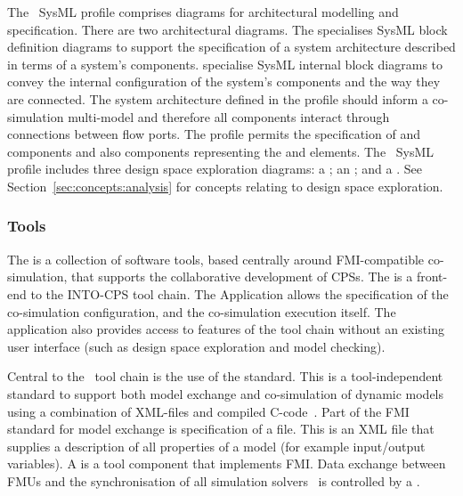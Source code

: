 The \into\ SysML profile comprises diagrams for architectural modelling and  specification. There are two architectural diagrams. The  specialises SysML block definition diagrams to support the specification of a system architecture described in terms of a system's components.  specialise SysML internal block diagrams to convey the internal configuration of the system's components and the way they are connected. The system architecture defined in the profile should inform a co-simulation multi-model and therefore all components interact through connections between flow ports. The profile permits the specification of  and  components and also components representing the  and  elements. The \into\ SysML profile includes three design space exploration diagrams: a ; an ; and a . See Section~\ref{sec:concepts:analysis} for concepts relating to design space exploration.


\subsubsection{Tools}
\label{sec:concepts:tools}

The  is a collection of software tools, based centrally around FMI-compatible co-simulation, that  supports the collaborative development of CPSs. The  is a front-end to the INTO-CPS tool chain. The Application allows the specification of the co-simulation configuration, and the co-simulation execution itself. The application also provides access to features of the tool chain without an existing user interface (such as design space exploration and model checking). 

Central to the \into\ tool chain is the use of the  standard. This is a tool-independent standard to support both model exchange and co-simulation of dynamic models using a combination of XML-files and compiled C-code~\cite{FMIStandard2.0}. Part of the FMI standard for model exchange is specification of a  file. This is an XML file that supplies a description of all properties of a model (for example input/output variables). A  is a tool component that implements FMI. Data exchange between FMUs and the synchronisation of all simulation solvers~\cite{FMIStandard2.0} is controlled by a .

